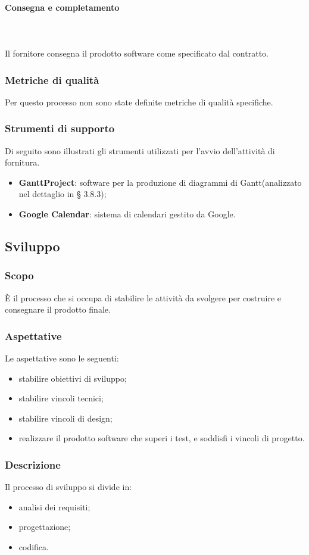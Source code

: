 			\paragraph{Consegna e completamento} \mbox{} \\ \mbox{} \\		
			Il fornitore consegna il prodotto software come specificato dal contratto.
		\subsubsection{Metriche di qualità}
		Per questo processo non sono state definite metriche di qualità specifiche.
		\subsubsection{Strumenti di supporto}
		Di seguito sono illustrati gli strumenti utilizzati per l'avvio dell'attività di fornitura.
		\begin{itemize}
			\item \textbf{GanttProject}: software per la produzione di diagrammi di Gantt\glo (analizzato nel dettaglio in § 3.8.3);
			\item \textbf{Google Calendar}: sistema di calendari gestito da Google.
		\end{itemize}

	\subsection{Sviluppo}
		\subsubsection{Scopo}È il processo che si occupa di stabilire le attività da svolgere per costruire e consegnare il prodotto finale.
		\subsubsection{Aspettative}
		Le aspettative sono le seguenti:
			\begin{itemize}
				\item stabilire obiettivi di sviluppo;
				\item stabilire vincoli tecnici;
				\item stabilire vincoli di design;
				\item realizzare il prodotto software che superi i test, e soddisfi i vincoli di progetto.
			\end{itemize}
		\subsubsection{Descrizione}
			Il processo di sviluppo si divide in:
				\begin{itemize}
					\item analisi dei requisiti;
					\item progettazione;
					\item codifica.
				\end{itemize}
